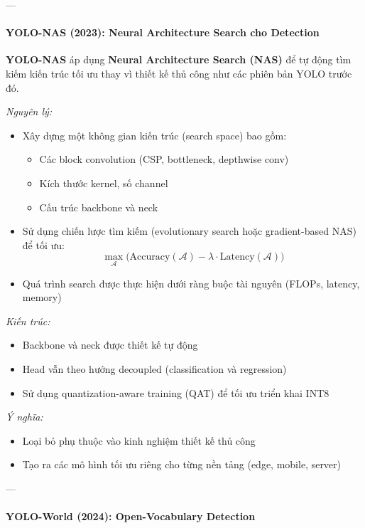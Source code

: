 ---

\paragraph{YOLO-NAS (2023): Neural Architecture Search cho Detection}

\textbf{YOLO-NAS} áp dụng \textbf{Neural Architecture Search (NAS)} để tự động tìm kiếm kiến trúc tối ưu thay vì thiết kế thủ công như các phiên bản YOLO trước đó.

\textit{Nguyên lý:}
\begin{itemize}
	\item Xây dựng một không gian kiến trúc (search space) bao gồm:
	\begin{itemize}
		\item Các block convolution (CSP, bottleneck, depthwise conv)
		\item Kích thước kernel, số channel
		\item Cấu trúc backbone và neck
	\end{itemize}
	
	\item Sử dụng chiến lược tìm kiếm (evolutionary search hoặc gradient-based NAS) để tối ưu:
	\[
	\max_{\mathcal{A}} \big( \text{Accuracy}(\mathcal{A}) - \lambda \cdot \text{Latency}(\mathcal{A}) \big)
	\]
	
	\item Quá trình search được thực hiện dưới ràng buộc tài nguyên (FLOPs, latency, memory)
\end{itemize}

\textit{Kiến trúc:}
\begin{itemize}
	\item Backbone và neck được thiết kế tự động
	\item Head vẫn theo hướng decoupled (classification và regression)
	\item Sử dụng quantization-aware training (QAT) để tối ưu triển khai INT8
\end{itemize}

\textit{Ý nghĩa:}
\begin{itemize}
	\item Loại bỏ phụ thuộc vào kinh nghiệm thiết kế thủ công
	\item Tạo ra các mô hình tối ưu riêng cho từng nền tảng (edge, mobile, server)
\end{itemize}

---

\paragraph{YOLO-World (2024): Open-Vocabulary Detection}

